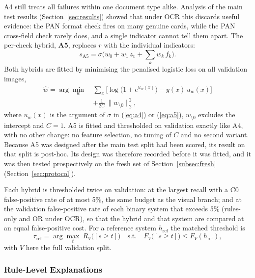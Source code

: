 \documentclass[12pt]{article}
\begin{document}
A4 still treats all failures within one document type alike. Analysis
of the main test results (Section~\ref{sec:results}) showed that under
OCR this discards useful evidence: the PAN format check fires on many
genuine cards, while the PAN cross-field check rarely does, and a single
indicator cannot tell them apart. The per-check hybrid, \textbf{A5},
replaces $r$ with the individual indicators:
\begin{equation}
\label{eq:a5}
s_{\mathrm{A5}} = \sigma\Big(w_0 + w_1\,z_v + \textstyle\sum_{k} w_{k}\,f_k\Big).
\end{equation}
Both hybrids are fitted by minimising the penalised logistic loss on
all validation images,
\begin{equation}
\label{eq:fit}
\begin{aligned}
\hat{w}=\arg\min_{w}\ &\sum_{x}\Big[\log\big(1+e^{u_w(x)}\big)-y(x)\,u_w(x)\Big]\\
&+\frac{1}{2C}\,\lVert w_{\setminus 0}\rVert_2^2,
\end{aligned}
\end{equation}
where $u_w(x)$ is the argument of $\sigma$ in (\ref{eq:a4}) or
(\ref{eq:a5}), $w_{\setminus 0}$ excludes the intercept and $C=1$.
A5 is fitted and thresholded on validation exactly like A4, with no
other change: no feature selection, no tuning of $C$ and no second
variant. Because A5 was designed after the main test split had been
scored, its result on that split is post-hoc. Its design was therefore
recorded before it was fitted, and it was then tested prospectively on
the fresh set of Section~\ref{subsec:fresh}
(Section~\ref{sec:protocol}).

Each hybrid is thresholded twice on validation: at the largest recall
with a C0 false-positive rate of at most 5\%, the same budget as the
visual branch; and at the validation false-positive rate of each
binary system that exceeds 5\% (rules-only and OR under OCR), so that
the hybrid and that system are compared at an equal false-positive
cost. For a reference system $h_{\mathrm{ref}}$ the matched threshold is
\begin{equation}
\label{eq:matched}
\tau_{\mathrm{ref}}=\arg\max_{t}\ R_{V}\big([s\ge t]\big)
\quad\text{s.t.}\quad F_{V}\big([s\ge t]\big)\le F_{V}(h_{\mathrm{ref}}),
\end{equation}
with $V$ here the full validation split.

\subsubsection{Rule-Level Explanations}
\label{subsec:explanations}
\end{document}
